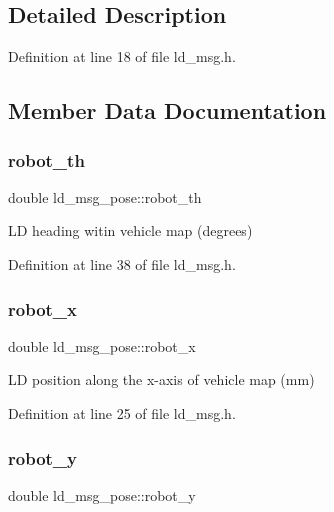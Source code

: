 \subsection{Detailed Description}


Definition at line 18 of file ld\+\_\+msg.\+h.



\subsection{Member Data Documentation}
\mbox{\label{structld__msg__pose_a0bc12453bebcdb0a0052149bfe585367}} 
\subsubsection{\texorpdfstring{robot\+\_\+th}{robot\_th}}
{\footnotesize\ttfamily double ld\+\_\+msg\+\_\+pose\+::robot\+\_\+th}

LD heading witin vehicle map (degrees) 

Definition at line 38 of file ld\+\_\+msg.\+h.

\mbox{\label{structld__msg__pose_a30c84490978ccf4a9092a15346d5cac0}} 
\subsubsection{\texorpdfstring{robot\+\_\+x}{robot\_x}}
{\footnotesize\ttfamily double ld\+\_\+msg\+\_\+pose\+::robot\+\_\+x}

LD position along the x-\/axis of vehicle map (mm) 

Definition at line 25 of file ld\+\_\+msg.\+h.

\mbox{\label{structld__msg__pose_ad0b8cca5ea09c38753c6b37197de67c4}} 
\subsubsection{\texorpdfstring{robot\+\_\+y}{robot\_y}}
{\footnotesize\ttfamily double ld\+\_\+msg\+\_\+pose\+::robot\+\_\+y}


